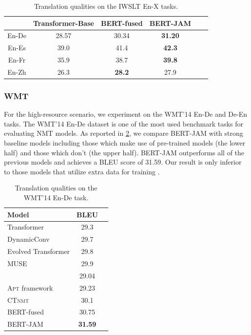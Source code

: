 \documentclass[review]{elsarticle}
\begin{document}
\begin{table}[ht]
    \caption{Translation qualities on the IWSLT En-X tasks.}
    \label{tab:iwslt_en2x}
    \centering
    \begin{tabular}{cccccc}
        \toprule
        & Transformer-Base & BERT-fused &  BERT-JAM    \\         
        \midrule
        En-De  &   28.57  &   30.34  &   \textbf{31.20} \\
        En-Es  &   39.0   &   41.4   &   \textbf{42.3}  \\
        En-Fr  &   35.9   &   38.7   &   \textbf{39.8}  \\
        En-Zh  &   26.3   &   \textbf{28.2}  &   27.9   \\
        \bottomrule
    \end{tabular}
\end{table}


\subsubsection{WMT}
For the high-resource scenario, we experiment on the WMT'14 En-De and De-En tasks. 
The WMT'14 En-De dataset is one of the most used benchmark tasks for evaluating NMT models. As reported in \cref{tab:wmt_en2de}, we compare BERT-JAM with strong baseline models including those which make use of pre-trained models (the lower half) and those which don't (the upper half). BERT-JAM outperforms all of the previous models and achieves a BLEU score of 31.59. Our result is only inferior to those models that utilize extra data for training \cite{Edunov18, Raffel19}.


\begin{table}[ht]
    \caption{Translation qualities on the WMT'14 En-De task.}
    \label{tab:wmt_en2de}
    \centering
    \begin{tabular}{lcc}
        \toprule
        \textbf{Model}            & \textbf{BLEU}    \\
        \midrule
        Transformer \cite{Vaswani17}  &   29.3  \\
        DynamicConv \cite{Wu19}         &     29.7  \\
        Evolved Transformer \cite{So19}          &   29.8    \\
        MUSE \cite{Zhao19} & 29.9 \\
        \midrule
        \citet{Imamura19} & 29.04 \\
        \textsc{Apt} framework \cite{Weng20} & 29.23 \\
        \textsc{CTnmt} \cite{Yang20} &   30.1   \\
        BERT-fused \cite{Zhu20}      &   30.75  \\
        BERT-JAM                     &   \textbf{31.59}  \\
        \bottomrule
    \end{tabular}
\end{table}
\end{document}
